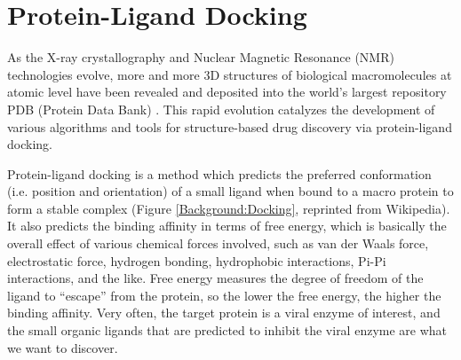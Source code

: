 \section{Protein-Ligand Docking}




As the X-ray crystallography and Nuclear Magnetic Resonance (NMR) technologies evolve, more and more 3D structures of biological macromolecules at atomic level have been revealed and deposited into the world's largest repository PDB (Protein Data Bank) \citep{540,537}. This rapid evolution catalyzes the development of various algorithms and tools for structure-based drug discovery via protein-ligand docking.

Protein-ligand docking is a method which predicts the preferred conformation (i.e. position and orientation) of a small ligand when bound to a macro protein to form a stable complex (Figure \ref{Background:Docking}, reprinted from Wikipedia). It also predicts the binding affinity in terms of free energy, which is basically the overall effect of various chemical forces involved, such as van der Waals force, electrostatic force, hydrogen bonding, hydrophobic interactions, Pi-Pi interactions, and the like. Free energy measures the degree of freedom of the ligand to ``escape'' from the protein, so the lower the free energy, the higher the binding affinity. Very often, the target protein is a viral enzyme of interest, and the small organic ligands that are predicted to inhibit the viral enzyme are what we want to discover.

